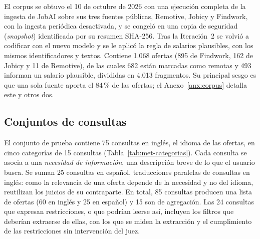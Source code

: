 El corpus se obtuvo el 10 de octubre de 2026 con una ejecución completa de la ingesta de JobAI sobre sus tres fuentes públicas, Remotive, Jobicy y Findwork, con la ingesta periódica desactivada, y se congeló en una copia de seguridad (\textit{snapshot}) identificada por su resumen SHA-256. Tras la Iteración~2 se volvió a codificar con el nuevo modelo y se le aplicó la regla de salarios plausibles, con los mismos identificadores y textos. Contiene 1.068 ofertas (895 de Findwork, 162 de Jobicy y 11 de Remotive), de las cuales 682 están marcadas como remotas y 493 informan un salario plausible, divididas en 4.013 fragmentos. Su principal sesgo es que una sola fuente aporta el 84\,\% de las ofertas; el Anexo~\ref{anx:corpus} detalla este y otros dos.

\subsection{Conjuntos de consultas}
\label{sec:met-consultas}

El conjunto de prueba contiene 75 consultas en inglés, el idioma de las ofertas, en cinco categorías de 15 consultas (Tabla~\ref{tab:met-categorias}). Cada consulta se asocia a una \emph{necesidad de información}, una descripción breve de lo que el usuario busca. Se suman 25 consultas en español, traducciones paralelas de consultas en inglés: como la relevancia de una oferta depende de la necesidad y no del idioma, reutilizan los juicios de su contraparte. En total, 85 consultas producen una lista de ofertas (60 en inglés y 25 en español) y 15 son de agregación. Las 24 consultas que expresan restricciones, o que podrían leerse así, incluyen los filtros que deberían extraerse de ellas, con los que se miden la extracción y el cumplimiento de las restricciones sin intervención del juez.

